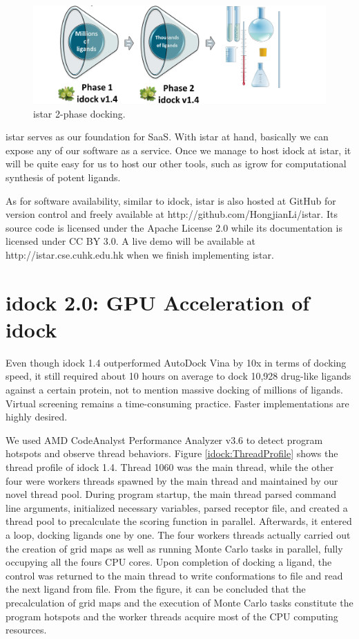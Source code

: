 \begin{figure}
\centering
\includegraphics[width=\linewidth]{istar/2PhaseDocking.png}
\caption{istar 2-phase docking.}
\label{istar:2PhaseDocking}
\end{figure}

istar serves as our foundation for SaaS. With istar at hand, basically we can expose any of our software as a service. Once we manage to host idock at istar, it will be quite easy for us to host our other tools, such as igrow for computational synthesis of potent ligands.

As for software availability, similar to idock, istar is also hosted at GitHub for version control and freely available at http://github.com/HongjianLi/istar. Its source code is licensed under the Apache License 2.0 while its documentation is licensed under CC BY 3.0. A live demo will be available at http://istar.cse.cuhk.edu.hk when we finish implementing istar.

\section{idock 2.0: GPU Acceleration of idock}

Even though idock 1.4 outperformed AutoDock Vina by 10x in terms of docking speed, it still required about 10 hours on average to dock 10,928 drug-like ligands against a certain protein, not to mention massive docking of millions of ligands. Virtual screening remains a time-consuming practice. Faster implementations are highly desired.

We used AMD CodeAnalyst Performance Analyzer v3.6 to detect program hotspots and observe thread behaviors. Figure \ref{idock:ThreadProfile} shows the thread profile of idock 1.4. Thread 1060 was the main thread, while the other four were workers threads spawned by the main thread and maintained by our novel thread pool. During program startup, the main thread parsed command line arguments, initialized necessary variables, parsed receptor file, and created a thread pool to precalculate the scoring function in parallel. Afterwards, it entered a loop, docking ligands one by one. The four workers threads actually carried out the creation of grid maps as well as running Monte Carlo tasks in parallel, fully occupying all the fours CPU cores. Upon completion of docking a ligand, the control was returned to the main thread to write conformations to file and read the next ligand from file. From the figure, it can be concluded that the precalculation of grid maps and the execution of Monte Carlo tasks constitute the program hotspots and the worker threads acquire most of the CPU computing resources.

